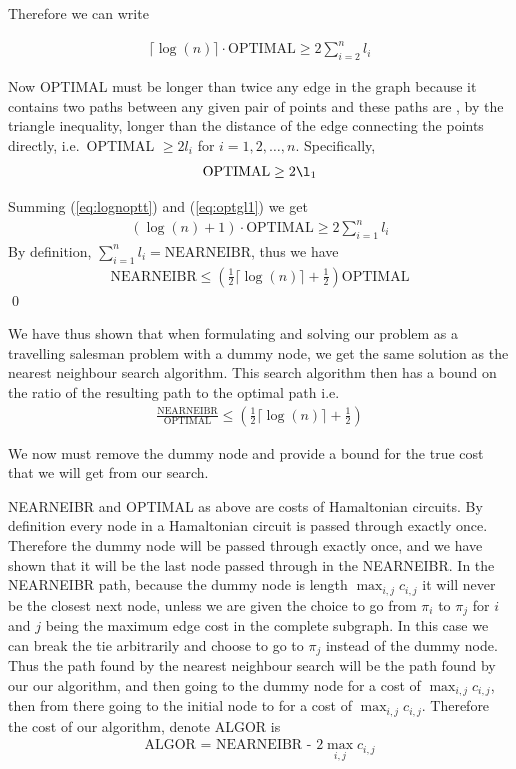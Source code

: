 Therefore we can write

\begin{align}
\lceil \log(n) \rceil \cdot \text{OPTIMAL} \geq 2 \sum_{i = 2}^n l_i \label{eq:lognoptt}
\end{align}

Now OPTIMAL must be longer than twice any edge in the graph because it contains two paths between any given pair of points and these paths are , by the triangle  inequality, longer than the distance of the edge connecting the points directly, i.e.\ OPTIMAL $\geq 2 l_i$ for $i = 1,2,\dots, n$. Specifically,
\begin{align}
\text{OPTIMAL} \geq 2 \l_1 \label{eq:optgl1}
\end{align}

Summing (\ref{eq:lognoptt}) and (\ref{eq:optgl1}) we get 
\begin{align*}
(\log(n)+1) \cdot \text{OPTIMAL} \geq 2 \sum_{i=1}^n l_i
\end{align*}
By definition, $\sum_{i=1}^n l_i = \text{NEARNEIBR}$, thus we have 
\begin{align*}
\text{NEARNEIBR} \leq (\frac{1}{2} \lceil \log(n) \rceil + \frac{1}{2}) \text{OPTIMAL}
\end{align*}
\qed 

We have thus shown that when formulating and solving our problem as a travelling salesman problem with a dummy node, we get the same solution as the nearest neighbour search algorithm. This search algorithm then has a bound on the ratio of the resulting path to the optimal path i.e.\ 
\begin{align*}
\frac{\text{NEARNEIBR}}{\text{OPTIMAL}} \leq (\frac{1}{2} \lceil \log(n) \rceil + \frac{1}{2}) 
\end{align*}

We now must remove the dummy node and provide a bound for the true cost that we will get from our search. 

NEARNEIBR and OPTIMAL as above are costs of Hamaltonian circuits. By definition every node in a Hamaltonian circuit is passed through exactly once. Therefore the dummy node will be passed through exactly once, and we have shown that it will be the last node passed through in the NEARNEIBR. In the NEARNEIBR path, because the dummy node is length $\max_{i,j} c_{i,j}$ it will never be the closest next node, unless we are given the choice to go from $\pi_i$ to $\pi_j$ for $i$ and $j$ being the maximum edge cost in the complete subgraph. In this case we can break the tie arbitrarily and choose to go to $\pi_j$ instead of the dummy node. Thus the path found by the nearest neighbour search will be the path found by our our algorithm, and then going to the dummy node for a cost of $\max_{i,j} c_{i,j}$, then from there going to the initial node to for a cost of $\max_{i,j} c_{i,j}$. Therefore the cost of our algorithm, denote ALGOR is 
\begin{align*}
\text{ALGOR = NEARNEIBR - } 2\max_{i,j} c_{i,j} 
\end{align*}

